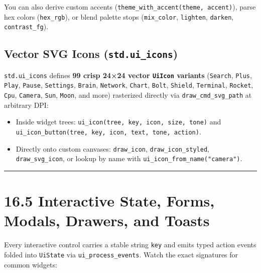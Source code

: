 \documentclass[
  english,
  oneside]{book}
\providecommand{\tightlist}{%
  \setlength{\itemsep}{0pt}\setlength{\parskip}{0pt}}
\begin{document}
You can also derive custom accents
(\texttt{theme\_with\_accent(theme,\ accent)}), parse hex colors
(\texttt{hex\_rgb}), or blend palette stops (\texttt{mix\_color},
\texttt{lighten}, \texttt{darken}, \texttt{contrast\_fg}).

\subsection{\texorpdfstring{Vector SVG Icons
(\texttt{std.ui\_icons})}{Vector SVG Icons (std.ui\_icons)}}\label{vector-svg-icons-std.ui_icons}

\texttt{std.ui\_icons} defines \textbf{99 crisp 24×24 vector
\texttt{UiIcon} variants} (\texttt{Search}, \texttt{Plus},
\texttt{Play}, \texttt{Pause}, \texttt{Settings}, \texttt{Brain},
\texttt{Network}, \texttt{Chart}, \texttt{Bolt}, \texttt{Shield},
\texttt{Terminal}, \texttt{Rocket}, \texttt{Cpu}, \texttt{Camera},
\texttt{Sun}, \texttt{Moon}, and more) rasterized directly via
\texttt{draw\_cmd\_svg\_path} at arbitrary DPI:

\begin{itemize}
\tightlist
\item
  Inside widget trees:
  \texttt{ui\_icon(tree,\ key,\ icon,\ size,\ tone)} and
  \texttt{ui\_icon\_button(tree,\ key,\ icon,\ text,\ tone,\ action)}.
\item
  Directly onto custom canvases: \texttt{draw\_icon},
  \texttt{draw\_icon\_styled}, \texttt{draw\_svg\_icon}, or lookup by
  name with \texttt{ui\_icon\_from\_name("camera")}.
\end{itemize}

\begin{center}\rule{0.5\linewidth}{0.5pt}\end{center}

\section{16.5 Interactive State, Forms, Modals, Drawers, and
Toasts}\label{interactive-state-forms-modals-drawers-and-toasts}

Every interactive control carries a stable string \texttt{key} and emits
typed action events folded into \texttt{UiState} via
\texttt{ui\_process\_events}. Watch the exact signatures for common
widgets:
\end{document}
